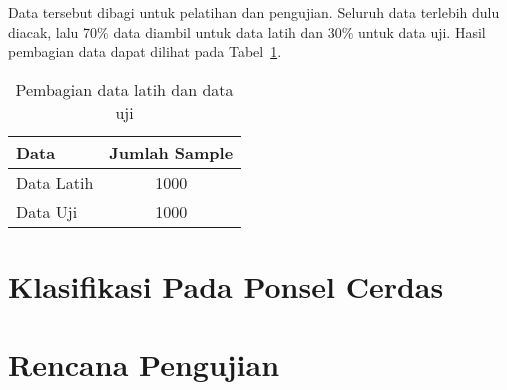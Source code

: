 Data tersebut dibagi untuk pelatihan dan pengujian. Seluruh data terlebih dulu diacak, lalu 70\% data diambil untuk data latih dan 30\% untuk data uji. Hasil pembagian data dapat dilihat pada Tabel~\ref{table:pembagian-data-latih-uji}.

\begin{table}[h!]
    \centering
    \caption{Pembagian data latih dan data uji}
    \begin{tabular}{ |l|c| }
        \hline
        \textbf{Data} & \textbf{Jumlah Sample} \\

        \hline
        Data Latih & 1000 \\

        \hline
        Data Uji & 1000 \\

        \hline
    \end{tabular}
    \label{table:pembagian-data-latih-uji}
\end{table}


\section{Klasifikasi Pada Ponsel Cerdas}

%
\section{Rencana Pengujian}
